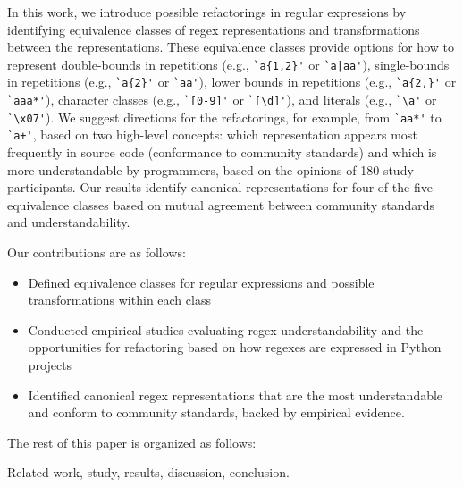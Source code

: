 In this work, we introduce possible refactorings in regular expressions by identifying equivalence classes of regex representations and transformations between the representations. 
These equivalence classes provide options for how to represent double-bounds in repetitions (e.g., \verb!`a{1,2}'! or \verb!`a|aa'!), single-bounds in repetitions (e.g., \verb!`a{2}'! or \verb!`aa'!), lower bounds in repetitions (e.g., \verb!`a{2,}'! or \verb!`aaa*'!), character classes (e.g., \verb!`[0-9]'! or \verb!`[\d]'!), and literals (e.g., \verb!`\a'! or \verb!`\x07'!). 
We suggest directions for the refactorings, for example, from \verb!`aa*'!  to  \verb!`a+'!, based on two high-level concepts: which representation appears most frequently in source code (conformance to community standards) and which is more understandable by programmers, based on the opinions of 180 study participants. 
Our results identify canonical representations for four of the five equivalence classes based on mutual agreement between community standards and understandability. 

Our contributions are as follows:
\begin{itemize}
\item Defined equivalence classes for regular expressions and possible transformations within each class
\item Conducted empirical studies evaluating regex understandability and the opportunities for refactoring based on how regexes are expressed in Python projects
\item {Identified canonical regex representations that are the most understandable and conform to community standards, backed by empirical evidence.}
\end{itemize}

The rest of this paper is organized as follows:

Related work, study, results, discussion, conclusion.
